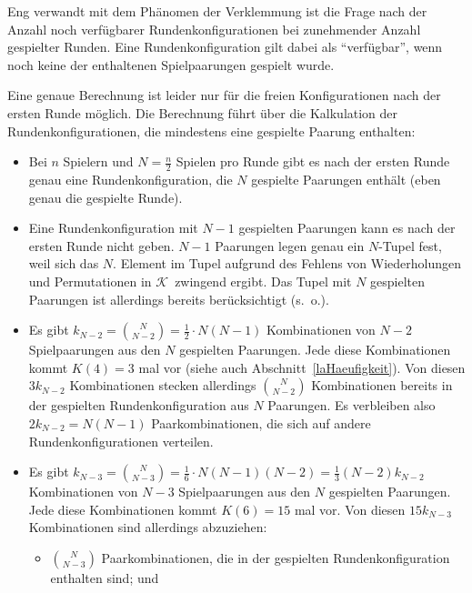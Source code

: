 \documentclass[DIV=15, 10pt]{scrartcl}
\newcommand{\KSet}{$\mathcal{K}$}
\begin{document}

Eng verwandt mit dem Phänomen der Verklemmung ist die Frage nach der Anzahl noch verfügbarer Rundenkonfigurationen bei zunehmender Anzahl gespielter Runden. Eine Rundenkonfiguration gilt dabei als "`verfügbar"', wenn noch keine der enthaltenen Spielpaarungen gespielt wurde.

Eine genaue Berechnung ist leider nur für die freien Konfigurationen nach der ersten Runde möglich. Die Berechnung führt über die Kalkulation der Rundenkonfigurationen, die mindestens eine gespielte Paarung enthalten:

\begin{itemize}

\item Bei $n$ Spielern und $N = \frac{n}{2}$ Spielen pro Runde gibt es nach der ersten Runde genau eine Rundenkonfiguration, die $N$ gespielte Paarungen enthält (eben genau die gespielte Runde).

\item Eine Rundenkonfiguration mit $N-1$ gespielten Paarungen kann es nach der ersten Runde nicht geben. $N-1$ Paarungen legen genau ein $N$-Tupel fest, weil sich das $N$. Element im Tupel aufgrund des Fehlens von Wiederholungen und Permutationen in \KSet\ zwingend ergibt. Das Tupel mit $N$ gespielten Paarungen ist allerdings bereits berücksichtigt (s.~o.).

\item Es gibt $k_{N-2} = {N\choose{N-2}} = \frac{1}{2} \cdot N(N-1)$ Kombinationen von $N-2$ Spielpaarungen aus den $N$ gespielten Paarungen. Jede diese Kombinationen kommt $K(4) = 3$ mal vor (siehe auch Abschnitt~\ref{laHaeufigkeit}). Von diesen $3k_{N-2}$ Kombinationen stecken allerdings ${N\choose{N-2}}$ Kombinationen bereits in der gespielten Rundenkonfiguration aus $N$ Paarungen. Es verbleiben also $2k_{N-2} = N(N-1)$ Paarkombinationen, die sich auf andere Rundenkonfigurationen verteilen.

\item Es gibt $k_{N-3} = {N\choose{N-3}} = \frac{1}{6} \cdot N(N-1)(N-2) =
\frac{1}{3} (N-2) k_{N-2}$ Kombinationen von $N-3$ Spielpaarungen aus den $N$ gespielten Paarungen. Jede diese Kombinationen kommt $K(6) = 15$ mal vor. Von diesen $15k_{N-3}$ Kombinationen sind allerdings abzuziehen:

\begin{itemize}

\item ${N\choose{N-3}}$ Paarkombinationen, die in der gespielten Rundenkonfiguration enthalten sind; und


\end{itemize}
\end{itemize}
\end{document}
